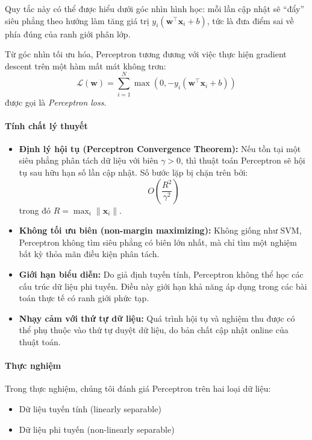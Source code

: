 Quy tắc này có thể được hiểu dưới góc nhìn hình học: mỗi lần cập nhật sẽ “đẩy” siêu phẳng theo hướng làm tăng giá trị $y_i (\boldsymbol{w}^\intercal \boldsymbol{x}_i + b)$, tức là đưa điểm sai về phía đúng của ranh giới phân lớp.

Từ góc nhìn tối ưu hóa, Perceptron tương đương với việc thực hiện gradient descent trên một hàm mất mát không trơn:
\[
\mathcal{L}(\boldsymbol{w}) = \sum_{i=1}^{N} \max(0, -y_i (\boldsymbol{w}^\intercal \boldsymbol{x}_i + b))
\]
được gọi là \textit{Perceptron loss}.

\paragraph{Tính chất lý thuyết}

\begin{itemize}
    \item \textbf{Định lý hội tụ (Perceptron Convergence Theorem):} Nếu tồn tại một siêu phẳng phân tách dữ liệu với biên $\gamma > 0$, thì thuật toán Perceptron sẽ hội tụ sau hữu hạn số lần cập nhật. Số bước lặp bị chặn trên bởi:
    \[
    O\left(\frac{R^2}{\gamma^2}\right)
    \]
    trong đó $R = \max_i \|\boldsymbol{x}_i\|$.

    \item \textbf{Không tối ưu biên (non-margin maximizing):} Không giống như SVM, Perceptron không tìm siêu phẳng có biên lớn nhất, mà chỉ tìm một nghiệm bất kỳ thỏa mãn điều kiện phân tách.

    \item \textbf{Giới hạn biểu diễn:} Do giả định tuyến tính, Perceptron không thể học các cấu trúc dữ liệu phi tuyến. Điều này giới hạn khả năng áp dụng trong các bài toán thực tế có ranh giới phức tạp.

    \item \textbf{Nhạy cảm với thứ tự dữ liệu:} Quá trình hội tụ và nghiệm thu được có thể phụ thuộc vào thứ tự duyệt dữ liệu, do bản chất cập nhật online của thuật toán.
\end{itemize}

\paragraph{Thực nghiệm}

Trong thực nghiệm, chúng tôi đánh giá Perceptron trên hai loại dữ liệu:
\begin{itemize}
    \item Dữ liệu tuyến tính (linearly separable)
    \item Dữ liệu phi tuyến (non-linearly separable)
\end{itemize}

